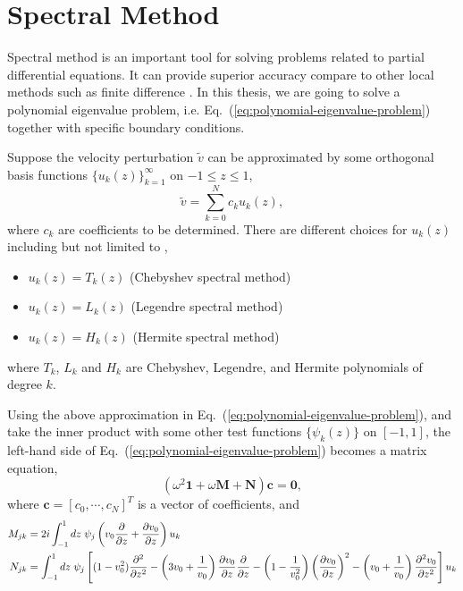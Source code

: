 \chapter{Spectral Method} \label{chap:spectral-method}
Spectral method is an important tool for solving problems related to partial differential equations. It can provide superior accuracy compare to other local methods such as finite difference \cite{shen_tang_etal_spectral_2011}. In this thesis, we are going to solve a polynomial eigenvalue problem, i.e. Eq.~(\ref{eq:polynomial-eigenvalue-problem}) together with specific boundary conditions.

Suppose the velocity perturbation $\tilde{v}$ can be approximated by some orthogonal basis functions $\{u_k(z)\}_{k=1}^{\infty}$ on $-1\leq z\leq 1$,
\begin{equation}
	\tilde{v} = \sum_{k=0}^{N} c_ku_k(z),
\end{equation}
where $c_k$ are coefficients to be determined. There are different choices for $u_k(z)$ including but not limited to \cite{shen_tang_etal_spectral_2011},
\begin{itemize}
	\item $u_k(z)=T_k(z)$ (Chebyshev spectral method)
	\item $u_k(z)=L_k(z)$ (Legendre spectral method)
	\item $u_k(z)=H_k(z)$ (Hermite spectral method)
\end{itemize}
where $T_k$, $L_k$ and $H_k$ are Chebyshev, Legendre, and Hermite polynomials of degree $k$.

Using the above approximation in Eq.~(\ref{eq:polynomial-eigenvalue-problem}), and take the inner product with some other test functions $\{\psi_k(z)\}$ on $[-1,1]$, the left-hand side of Eq.~(\ref{eq:polynomial-eigenvalue-problem}) becomes a matrix equation,
\begin{equation}
	(\omega^2\mathbf{1} + \omega\mathbf{M} + \mathbf{N})\mathbf{c} = \mathbf{0},
	\label{eq:pep-matrix-equation}
\end{equation}
where $\mathbf{c} = [c_0, \cdots, c_N]^T$ is a vector of coefficients, and
\begin{align}
	M_{jk} & = 2i\int_{-1}^{1}dz \; \psi_{j}\left(v_0\pdv{}{z} +\pdv{v_0}{z} \right)u_{k}
	\label{eq:operator-matrix-M}                                                          \\
	N_{jk} & = \int_{-1}^{1}dz \; \psi_{j} \left[(1-v_0^2)\pdv[2]{}{z}
		-\left(3v_0 + \frac{1}{v_0}\right)\pdv{v_0}{z}\pdv{}{z}
		- \left(1-\frac{1}{v_0^2}\right)\left(\pdv{v_0}{z}\right)^2
		- \left(v_0+\frac{1}{v_0}\right)\pdv[2]{v_0}{z}\right] u_{k}
	\label{eq:operator-matrix-N}
\end{align}

